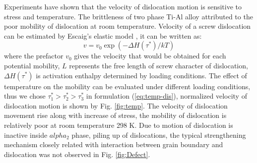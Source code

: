 \documentclass[Unknown,article,submit,moreauthors,pdftex,10pt,a4paper]{Definitions/mdpi}
\begin{document}
Experiments have shown that the velocity of dislocation motion is sensitive to stress and temperature\cite{Stein1960}. The brittleness of two phase Ti-Al alloy attributed to the poor mobility of dislocation at room temperature. Velocity of a screw dislocation can be estimated by Escaig's elastic model \cite{Escaig1968}, it can be written as:
\begin{equation}\label{eq:temp-dis}
v = v_0 \exp(-\Delta H(\tau^*)/kT)
\end{equation}
where the prefactor $v_0$ gives the velocity that would be obtained for each potential mobility, $L$ represents the free length of screw character of dislocation, $\Delta H(\tau^*)$ is activation enthalpy determined by loading conditions. The effect of temperature on the mobility can be evaluated under different loading conditions, thus we chose  $\tau_1^*>\tau_2^*>\tau_3^*$ in formulation (\ref{eq:temp-dis}), normalized velocity of dislocation motion is shown by Fig. \ref{fig:temp}. The  velocity  of dislocation movement rise along with increase of  stress, the mobility  of dislocation is relatively poor at room temperature 298 K. Due to motion of dislocation is inactive inside $alpha_2$ phase, piling up of dislocations, the typical strengthening mechanism closely related with interaction between grain boundary and dislocation was not observed in Fig. \ref{fig:Defect}.
\end{document}
